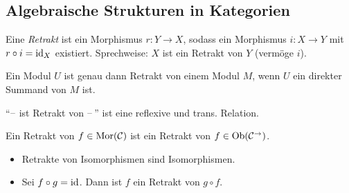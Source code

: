\documentclass{cheat-sheet}
\newenvironment{centertikzcd}
  {\begin{center}\begin{tikzcd}}
  {\end{tikzcd}\end{center}}
\begin{document}
\subsection{Algebraische Strukturen in Kategorien}

\begin{defn}
  Eine \emph{Retrakt} ist ein Morphismus $r : Y \to X$, sodass ein Morphismus $i : X \to Y$ mit $r \circ i = \operatorname{id}_X$ existiert.
  Sprechweise: $X$ ist ein Retrakt von $Y$ (vermöge $i$).
\end{defn}


\begin{bsp}
  Ein Modul $U$ ist genau dann Retrakt von einem Modul $M$, wenn $U$ ein direkter Summand von $M$ ist.
\end{bsp}

\begin{prop}
  "`$\text{--}$ ist Retrakt von $\text{--}$\,"' ist eine reflexive und trans. Relation.
\end{prop}


\begin{bem}
  Ein Retrakt von $f \in \operatorname{Mor}(\mathcal{C})$ ist ein Retrakt von $f \in \operatorname{Ob}(\mathcal{C}^{\to})$.
\end{bem}

\begin{prop}
  \begin{itemize}
    \item Retrakte von Isomorphismen sind Isomorphismen.
    \item Sei $f \circ g = \operatorname{id}$. Dann ist $f$ ein Retrakt von $g \circ f$.
  \end{itemize}
\end{prop}

\end{document}
